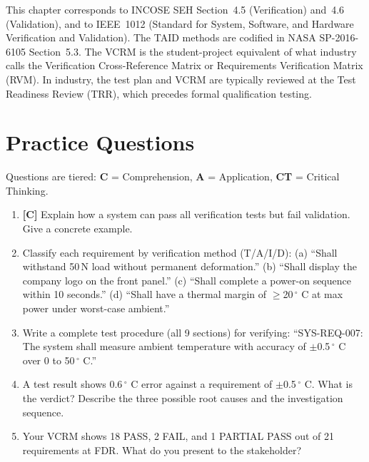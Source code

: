 \documentclass[11pt,letterpaper,twoside,openany]{book}
\begin{document}
\begin{tipbox}
This chapter corresponds to INCOSE SEH Section~4.5 (Verification) and~4.6 (Validation), and to IEEE~1012 (Standard for System, Software, and Hardware Verification and Validation). The TAID methods are codified in NASA SP-2016-6105 Section~5.3. The VCRM is the student-project equivalent of what industry calls the Verification Cross-Reference Matrix or Requirements Verification Matrix (RVM). In industry, the test plan and VCRM are typically reviewed at the Test Readiness Review (TRR), which precedes formal qualification testing.
\end{tipbox}

\FloatBarrier
\section{Practice Questions}
Questions are tiered: \textbf{C} = Comprehension, \textbf{A} = Application, \textbf{CT} = Critical Thinking.
\begin{enumerate}[leftmargin=1.5em]
\item \textbf{[C]} Explain how a system can pass all verification tests but fail validation. Give a concrete example.
\item Classify each requirement by verification method (T/A/I/D): (a) ``Shall withstand 50\,N load without permanent deformation.'' (b) ``Shall display the company logo on the front panel.'' (c) ``Shall complete a power-on sequence within 10 seconds.'' (d) ``Shall have a thermal margin of $\geq$20\,$^{\circ}$ C at max power under worst-case ambient.''
\item Write a complete test procedure (all 9 sections) for verifying: ``SYS-REQ-007: The system shall measure ambient temperature with accuracy of $\pm$0.5\,$^{\circ}$ C over 0 to 50\,$^{\circ}$ C.''
\item A test result shows 0.6\,$^{\circ}$ C error against a requirement of $\pm$0.5\,$^{\circ}$ C. What is the verdict? Describe the three possible root causes and the investigation sequence.
\item Your VCRM shows 18 PASS, 2 FAIL, and 1 PARTIAL PASS out of 21 requirements at FDR. What do you present to the stakeholder?
\end{enumerate}
\end{document}
